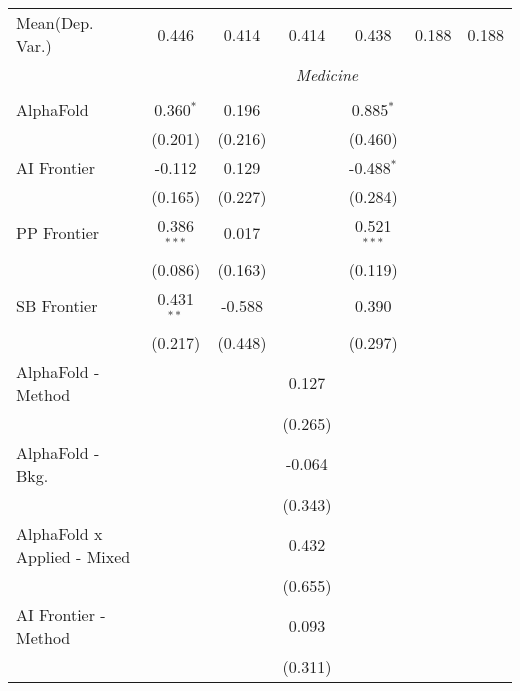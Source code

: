 \begin{tabular}{lcccccc}
Mean(Dep. Var.) & 0.446 & 0.414 & 0.414 & 0.438 & 0.188 & 0.188 \\
 & \multicolumn{6}{c}{\textit{Medicine}} \\ \\
   AlphaFold                     & 0.360$^{*}$   & 0.196   &                & 0.885$^{*}$   &        &   \\   
                                 & (0.201)       & (0.216) &                & (0.460)       &        &   \\   
   AI Frontier                   & -0.112        & 0.129   &                & -0.488$^{*}$  &        &   \\   
                                 & (0.165)       & (0.227) &                & (0.284)       &        &   \\   
   PP Frontier                   & 0.386$^{***}$ & 0.017   &                & 0.521$^{***}$ &        &   \\   
                                 & (0.086)       & (0.163) &                & (0.119)       &        &   \\   
   SB Frontier                   & 0.431$^{**}$  & -0.588  &                & 0.390         &        &   \\   
                                 & (0.217)       & (0.448) &                & (0.297)       &        &   \\   
   AlphaFold - Method            &               &         & 0.127          &               &        &   \\   
                                 &               &         & (0.265)        &               &        &   \\   
   AlphaFold - Bkg.              &               &         & -0.064         &               &        &   \\   
                                 &               &         & (0.343)        &               &        &   \\   
   AlphaFold x Applied - Mixed   &               &         & 0.432          &               &        &   \\   
                                 &               &         & (0.655)        &               &        &   \\   
   AI Frontier - Method          &               &         & 0.093          &               &        &   \\   
                                 &               &         & (0.311)        &               &        &   \\   

\end{tabular}
